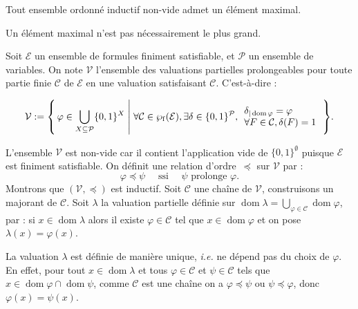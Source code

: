 \documentclass[./main]{subfiles}
\begin{document}
  \begin{lem}
    Tout ensemble ordonné inductif non-vide admet un élément maximal.
  \end{lem}

  \begin{rmk}
    Un élément maximal n'est pas nécessairement le plus grand.
  \end{rmk}

  \vspace{1.5em}

  \begin{prv}
    Soit $\mathcal{E}$ un ensemble de formules finiment satisfiable, et $\mathcal{P}$ un ensemble de variables.
    On note $\mathcal{V}$ l'ensemble des valuations partielles prolongeables pour toute partie finie $\mathcal{C}$ de $\mathcal{E}$ en une valuation satisfaisant $\mathcal{C}$.
    C'est-à-dire :

    {
      \footnotesize
    \[
    \mathcal{V} := \mleft\{\,\varphi \in \bigcup_{X \subseteq \mathcal{P}} \{0,1\}^X \;\middle|\; \forall \mathcal{C} \in \wp_\mathrm{f}(\mathcal{E}), \exists \delta \in \{0,1\}^\mathcal{P}, 
      \begin{array}{l}
        \delta_{|\operatorname{dom}\varphi} = \varphi\\
        \forall F \in \mathcal{C}, \delta(F) = 1
      \end{array}
    \,\mright\} 
    .\] 
    }

    L'ensemble $\mathcal{V}$ est non-vide car il contient l'application vide de $\{0,1\}^\emptyset$ puisque $\mathcal{E}$ est finiment satisfiable.
    On définit une relation d'ordre~$\preceq$ sur $\mathcal{V}$ par : \[
      \varphi \preceq \psi \quad \text{ ssi } \quad \psi \text{ prolonge } \varphi
    .\]
    Montrons que $(\mathcal{V}, \preceq)$ est inductif.
    Soit $\mathcal{C}$ une chaîne de $\mathcal{V}$, construisons un majorant de $\mathcal{C}$.
    Soit $\lambda$ la valuation partielle définie sur $\operatorname{dom}\lambda = \bigcup_{\varphi \in \mathcal{C}} \operatorname{dom} \varphi$, par : 
    si $x \in \operatorname{dom} \lambda$ alors il existe $\varphi \in \mathcal{C}$ tel que $x \in \operatorname{dom} \varphi$ et on pose $\lambda(x) = \varphi(x)$.

    La valuation $\lambda$ est définie de manière unique,  \textit{i.e.} ne dépend pas du choix de $\varphi$. En effet, pour tout $x \in \operatorname{dom} \lambda$ et tous $\varphi \in \mathcal{C}$ et $\psi \in \mathcal{C}$ tels que $x \in \operatorname{dom} \varphi \cap \operatorname{dom} \psi$, comme $\mathcal{C}$ est une chaîne on a $\varphi \preceq \psi$ ou $\psi \preceq \varphi$, donc $\varphi(x) = \psi(x)$.


\end{prv}
\end{document}
